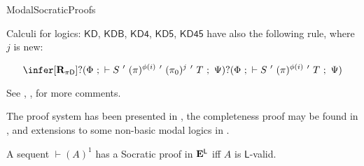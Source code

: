\begin{entry}{ModalSocraticProofs}
\begin{calculus}
\smallskip

Calculi for logics: $\mathsf{KD}$, $\mathsf{KDB}$, $\mathsf{KD4}$, $\mathsf{KD5}$, $\mathsf{KD45}$ have also the following rule, where $j$ is new:

$$
\infer[\mathbf{R}_{\pi\mathsf{D}}]{?(\Phi ~;~ \vdash S ~'~ (\pi)^{\phi(i)} ~'~ (\pi_0)^{j} ~'~ T ~;~ \Psi)}{?(\Phi ~;~ \vdash S ~'~ (\pi)^{\phi(i)} ~'~ T ~;~ \Psi)}
$$
\end{calculus}

\begin{clarifications}
See , ,  for more comments.
\end{clarifications}

\begin{history}
The proof system has been presented in \cite{DLJ:2004}, the completeness proof may be found in \cite{DLJ:2007}, and extensions to some non-basic modal logics in \cite{DLJ:2008}.
\end{history}

\begin{technicalities}
A sequent $\vdash (A)^1$ has a Socratic proof in $\mathbf{E}^\mathsf{L}$ iff $A$ is $\mathsf{L}$-valid.
\end{technicalities}













\end{entry}
